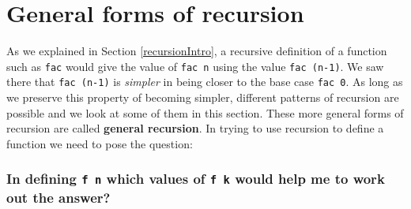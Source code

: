 \section{General forms of recursion}
\label{genRecursion}

As we explained  in Section \ref{recursionIntro}, a recursive
definition of a function such as \texttt{fac} would give the value of
\texttt{fac n}
using the value \texttt{fac (n-1)}. We saw there that \texttt{fac (n-1)}
is {\em simpler\/} in being closer to the base case \texttt{fac 0}. As
long as we preserve this property of becoming simpler, different patterns
of recursion are possible  and we look at some of them in this section.
These more general forms of recursion are called \textbf{general
recursion}.
In trying to use recursion to define a function we need to pose the
question:

\subsubsection*{In defining {\tt f n} which values of
{\tt f k} would help me to work out the answer?}

